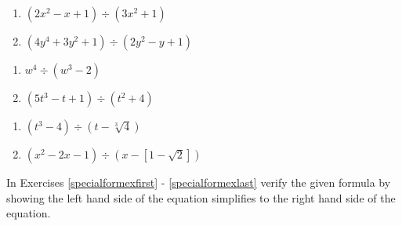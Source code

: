 \begin{multicols}{2}
\begin{enumerate}
\setcounter{enumi}{\value{HW}}

\item $(2x^2 - x + 1) \div (3x^2 + 1)$

\item $(4y^4+3y^2+1) \div (2y^2-y+1)$

\setcounter{HW}{\value{enumi}}
\end{enumerate}
\end{multicols}

\begin{multicols}{2}
\begin{enumerate}
\setcounter{enumi}{\value{HW}}

\item $w^4 \div (w^3 - 2)$
\item $(5t^3 - t + 1) \div (t^2 + 4)$



\setcounter{HW}{\value{enumi}}
\end{enumerate}
\end{multicols}

\begin{multicols}{2}
\begin{enumerate}
\setcounter{enumi}{\value{HW}}
\item $(t^3 - 4) \div (t - \sqrt[3]{4})$

\item $(x^2-2x-1) \div (x-[1-\sqrt{2}])$  \label{polydivexlast}

\setcounter{HW}{\value{enumi}}
\end{enumerate}
\end{multicols}

In Exercises \ref{specialformexfirst} - \ref{specialformexlast} verify the given formula by showing the left hand side of the equation simplifies to the right hand side of the equation.

